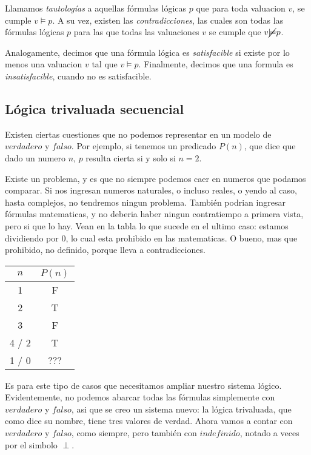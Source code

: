 \documentclass{article}
\begin{document}
Llamamos \textit{tautologías} a aquellas fórmulas lógicas $p$ que para toda valuacion $v$, se cumple $v \models p$. A su vez, existen las \textit{contradicciones}, las cuales son todas las fórmulas lógicas $p$ para las que todas las valuaciones $v$ se cumple que $v \cancel{\models} p$.

Analogamente, decimos que una fórmula lógica es \textit{satisfacible} si existe por lo menos una valuacion $v$ tal que $v \models p$. Finalmente, decimos que una formula es  \textit{insatisfacible}, cuando no es satisfacible.

\subsection{Lógica trivaluada secuencial}

Existen ciertas cuestiones que no podemos representar en un modelo de $verdadero$ y $falso$. Por ejemplo, si tenemos un predicado $P(n)$, que dice que dado un numero $n$, $p$ resulta cierta si y solo si $n=2$.

Existe un problema, y es que no siempre podemos caer en numeros que podamos comparar. Si nos ingresan numeros naturales, o incluso reales, o yendo al caso, hasta complejos, no tendremos ningun problema. También podrian ingresar fórmulas matematicas, y no deberia haber ningun contratiempo a primera vista, pero si que lo hay. Vean en la tabla lo que sucede en el ultimo caso: estamos dividiendo por 0, lo cual esta prohibido en las matematicas. O bueno, mas que prohibido, no definido, porque lleva a contradicciones.

\begin{center}
\begin{tabular}{|c|c|}
	\hline
	$n$ & $P(n)$ \\
	\hline
	1 & F \\
	\hline
	2 & T \\
	\hline
	3 & F \\
	\hline
	4 / 2 & T \\
	\hline
	1 / 0 & ??? \\
	\hline
\end{tabular}
\end{center}

Es para este tipo de casos que necesitamos ampliar nuestro sistema lógico. Evidentemente, no podemos abarcar todas las fórmulas simplemente con $verdadero$ y $falso$, asi que se creo un sistema nuevo: la lógica trivaluada, que como dice su nombre, tiene tres valores de verdad. Ahora vamos a contar con $verdadero$ y $falso$, como siempre, pero también con $indefinido$, notado a veces por el simbolo $\perp$.
\end{document}
